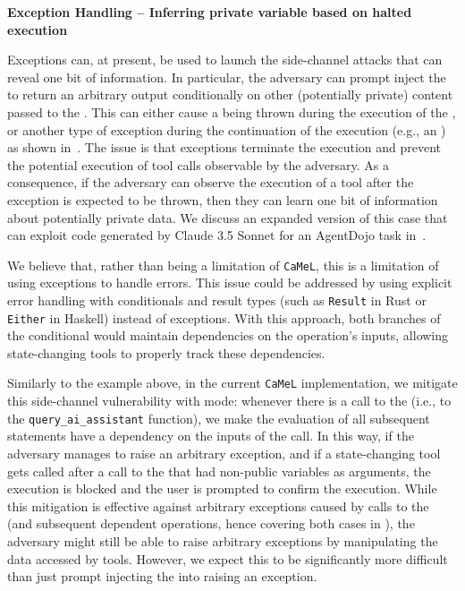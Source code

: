 \documentclass[11pt, a4paper, logo, copyright]{googledeepmind}
\newcommand{\sysname}{\texttt{CaMeL}\xspace}
\begin{document}
\textbf{Exception Handling -- Inferring private variable based on halted execution}

Exceptions can, at present, be used to launch the side-channel attacks that can reveal one bit of information. In particular, the adversary can prompt inject the \qllm to return an arbitrary output conditionally on other (potentially private) content passed to the \qllm. This can either cause a  being thrown during the execution of the \qllm, or another type of exception during the continuation of the execution (e.g., an ) as shown in~. The issue is that exceptions terminate the execution and prevent the potential execution of tool calls observable by the adversary. As a consequence, if the adversary can observe the execution of a tool after the exception is expected to be thrown, then they can learn one bit of information about potentially private data. We discuss an expanded version of this case that can exploit code generated by Claude 3.5 Sonnet for an AgentDojo task in~.

We believe that, rather than being a limitation of \sysname, this is a limitation of using exceptions to handle errors. This issue could be addressed by using explicit error handling with conditionals and result types (such as \texttt{Result} in Rust or \texttt{Either} in Haskell) instead of exceptions. With this approach, both branches of the conditional would maintain dependencies on the operation's inputs, allowing state-changing tools to properly track these dependencies.

Similarly to the example above, in the current \sysname implementation, we mitigate this side-channel vulnerability with   mode: whenever there is a call to the \qllm (i.e., to the \texttt{query\_ai\_as\-sistant} function), we make the evaluation of all subsequent statements have a dependency on the inputs of the \qllm call. In this way, if the adversary manages to raise an arbitrary exception, and if a state-changing tool gets called after a call to the \qllm that had non-public variables as arguments, the execution is blocked and the user is prompted to confirm the execution. While this mitigation is effective against arbitrary exceptions caused by calls to the \qllm (and subsequent dependent operations, hence covering both cases in ), the adversary might still be able to raise arbitrary exceptions by manipulating the data accessed by tools. However, we expect this to be significantly more difficult than just prompt injecting the \qllm into raising an exception.
\end{document}
